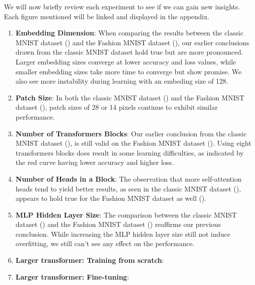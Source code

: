 We will now briefly review each experiment to see if we can gain new insights. Each figure mentioned will be linked and displayed in the appendix.
\begin{enumerate}
    \item \textbf{Embedding Dimension}: When comparing the results between the classic MNIST dataset () and the Fashion MNIST dataset (), our earlier conclusions drawn from the classic MNIST dataset hold true but are more pronounced. Larger embedding sizes converge at lower accuracy and loss values, while smaller embedding sizes take more time to converge but show promise. We also see more instability during learning with an embeding size of 128.

    \item \textbf{Patch Size}: In both the classic MNIST dataset () and the Fashion MNIST dataset (), patch sizes of 28 or 14 pixels continue to exhibit similar performance. 

    \item \textbf{Number of Transformers Blocks}: Our earlier conclusion from the classic MNIST dataset (), is still valid on the Fashion MNIST dataset (). Using eight transformers blocks does result in some learning difficulties, as indicated by the red curve having lower accuracy and higher loss.

    \item \textbf{Number of Heads in a Block}: The observation that more self-attention heads tend to yield better results, as seen in the classic MNIST dataset (), appears to hold true for the Fashion MNIST dataset as well ().

    \item \textbf{MLP Hidden Layer Size}: The comparison between the classic MNIST dataset () and the Fashion MNIST dataset () reaffirms our previous conclusion. While increasing the MLP hidden layer size still not induce overfitting, we still can't see any effect on the performance.
    
    \item \textbf{Larger transformer: Training from scratch}:
    \item \textbf{Larger transformer: Fine-tuning}:
\end{enumerate}
